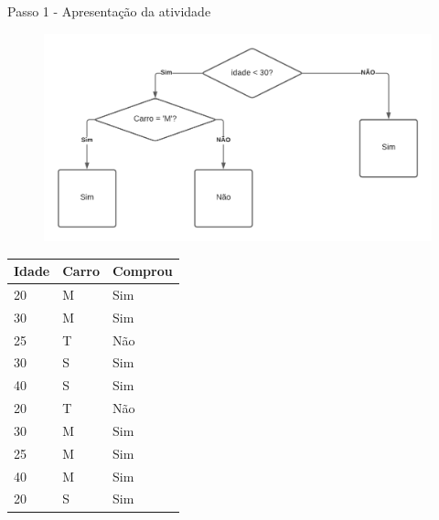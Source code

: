 \documentclass{beamer}
\begin{document}
\begin{frame}{Passo 1 - Apresentação da atividade}


\begin{multicols}{2}

\begin{figure}
\begin{center}
	\includegraphics[scale=0.3]{images/carro.png} 
\end{center}

\end{figure}

\columnbreak

\begin{tabular}{|l|l|l|}
\hline
Idade & Carro & Comprou\\
\hline
20  & M & Sim\\
30  & M & Sim\\
25  & T & Não\\
30  & S & Sim\\
40  & S & Sim\\
20  & T & Não\\
30  & M & Sim\\
25  & M & Sim\\
40  & M & Sim\\
20  & S & Sim\\






\hline

\end{tabular}





\end{multicols}


 
\end{frame}
\end{document}
